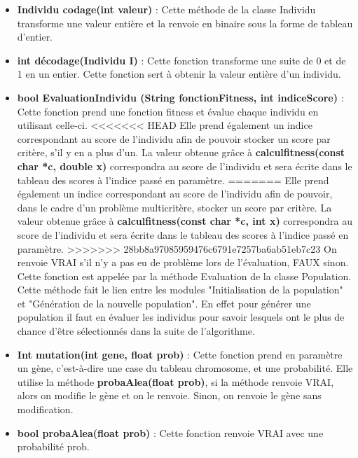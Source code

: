 \documentclass[a4paper,11pt]{article}
\begin{document}
				\begin{itemize}
							\item \textbf{Individu codage(int valeur)} : Cette méthode de la classe Individu transforme une valeur entière et la renvoie en binaire sous la forme de tableau d’entier.\vspace{0.2cm}
							\item \textbf{int décodage(Individu I)} : Cette fonction transforme une suite de 0 et de 1 en un entier. Cette fonction sert à obtenir la valeur entière d’un individu.\vspace{0.2cm}
							\item \textbf{bool EvaluationIndividu (String fonctionFitness, int indiceScore)} : Cette fonction prend une fonction fitness et évalue chaque individu en utilisant celle-ci. 
<<<<<<< HEAD
																									Elle prend également un indice correspondant  au score de l’individu afin de pouvoir stocker un score par critère, s'il y en a plus d'un. 
																									La valeur obtenue grâce à \textbf{calculfitness(const char *c, double x)} correspondra au score de l’individu et sera écrite dans le tableau des scores à l’indice passé en paramètre.
=======
																									Elle prend également un indice correspondant  au score de l’individu afin de pouvoir, dans le cadre d’un problème multicritère, stocker un score par critère. 
																									La valeur obtenue grâce à \textbf{calculfitness(const char *c, int x)} correspondra au score de l’individu et sera écrite dans le tableau des scores à l’indice passé en paramètre.
>>>>>>> 28bb8a97085959476c6791e7257ba6ab51eb7c23
																									On renvoie VRAI s’il n’y a pas eu de problème lors de l’évaluation, FAUX sinon. Cette fonction est appelée par la méthode Evaluation de la classe Population.
																									Cette méthode fait le lien entre les modules "Initialisation de la population" et "Génération de la nouvelle population".
																									En effet pour générer une population il faut en évaluer les individus pour savoir lesquels ont le plus de chance d'être sélectionnés dans la suite de l'algorithme.\vspace{0.2cm}
							\item \textbf{Int mutation(int gene, float prob)} : Cette fonction prend en paramètre un gène, c’est-à-dire une case du tableau chromosome, et une probabilité.
																		Elle utilise la méthode \textbf{probaAlea(float prob)}, si la méthode renvoie VRAI, alors on modifie le gène et on le renvoie.
																		Sinon, on renvoie le gène sans modification.\vspace{0.2cm}
							\item \textbf{bool probaAlea(float prob)} : Cette fonction renvoie VRAI avec une probabilité prob.\vspace{0.2cm}


\end{itemize}
\end{document}
